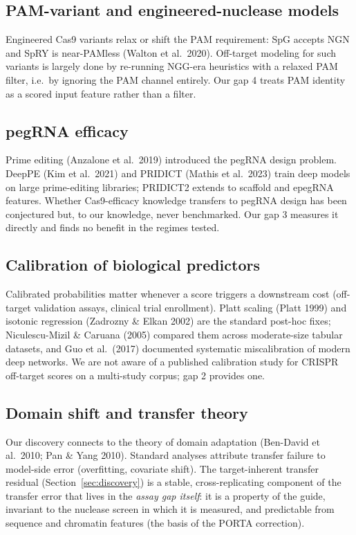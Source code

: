 \subsection{PAM-variant and engineered-nuclease models}
Engineered Cas9 variants relax or shift the PAM requirement: SpG accepts
NGN and SpRY is near-PAMless (Walton et al.\ 2020). Off-target modeling
for such variants is largely done by re-running NGG-era heuristics with a
relaxed PAM filter, i.e.\ by ignoring the PAM channel entirely. Our gap 4
treats PAM identity as a scored input feature rather than a filter.

\subsection{pegRNA efficacy}
Prime editing (Anzalone et al.\ 2019) introduced the pegRNA design
problem. DeepPE (Kim et al.\ 2021) and PRIDICT (Mathis et al.\ 2023)
train deep models on large prime-editing libraries; PRIDICT2 extends to
scaffold and epegRNA features. Whether Cas9-efficacy knowledge transfers
to pegRNA design has been conjectured but, to our knowledge, never
benchmarked. Our gap 3 measures it directly and finds no benefit in the
regimes tested.

\subsection{Calibration of biological predictors}
Calibrated probabilities matter whenever a score triggers a downstream
cost (off-target validation assays, clinical trial enrollment).
Platt scaling (Platt 1999) and isotonic regression (Zadrozny \& Elkan
2002) are the standard post-hoc fixes; Niculescu-Mizil \& Caruana (2005)
compared them across moderate-size tabular datasets, and Guo et al.\ (2017)
documented systematic miscalibration of modern deep networks. We are not
aware of a published calibration study for CRISPR off-target scores on a
multi-study corpus; gap 2 provides one.

\subsection{Domain shift and transfer theory}
Our discovery connects to the theory of domain adaptation (Ben-David et
al.\ 2010; Pan \& Yang 2010). Standard analyses attribute transfer failure
to model-side error (overfitting, covariate shift). The target-inherent
transfer residual (Section~\ref{sec:discovery}) is a stable,
cross-replicating component of the transfer error that lives in the
\emph{assay gap itself}: it is a property of the guide, invariant to the
nuclease screen in which it is measured, and predictable from sequence
and chromatin features (the basis of the PORTA correction).
